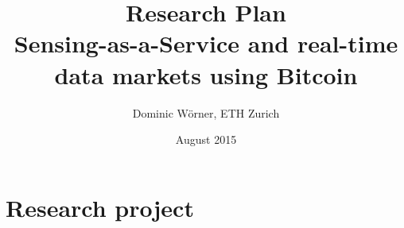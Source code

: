 \documentclass[a4paper, 12pt]{scrartcl}
\title{Research Plan \\
	Sensing-as-a-Service and real-time data markets using Bitcoin}
\author{Dominic W\"orner, ETH Zurich}
\date{August 2015}
\begin{document}
\maketitle

    
\section{Research project}

\end{document}
